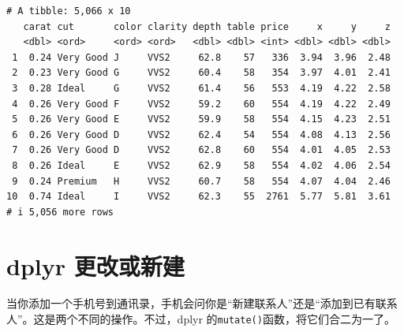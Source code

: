 \documentclass[
  letterpaper,
]{ctexbook}
\begin{document}
\begin{verbatim}
# A tibble: 5,066 x 10
   carat cut       color clarity depth table price     x     y     z
   <dbl> <ord>     <ord> <ord>   <dbl> <dbl> <int> <dbl> <dbl> <dbl>
 1  0.24 Very Good J     VVS2     62.8    57   336  3.94  3.96  2.48
 2  0.23 Very Good G     VVS2     60.4    58   354  3.97  4.01  2.41
 3  0.28 Ideal     G     VVS2     61.4    56   553  4.19  4.22  2.58
 4  0.26 Very Good F     VVS2     59.2    60   554  4.19  4.22  2.49
 5  0.26 Very Good E     VVS2     59.9    58   554  4.15  4.23  2.51
 6  0.26 Very Good D     VVS2     62.4    54   554  4.08  4.13  2.56
 7  0.26 Very Good D     VVS2     62.8    60   554  4.01  4.05  2.53
 8  0.26 Ideal     E     VVS2     62.9    58   554  4.02  4.06  2.54
 9  0.24 Premium   H     VVS2     60.7    58   554  4.07  4.04  2.46
10  0.74 Ideal     I     VVS2     62.3    55  2761  5.77  5.81  3.61
# i 5,056 more rows
\end{verbatim}

\hypertarget{dplyr-ux66f4ux6539ux6216ux65b0ux5efa}{%
\chapter{dplyr 更改或新建}\label{dplyr-ux66f4ux6539ux6216ux65b0ux5efa}}

当你添加一个手机号到通讯录，手机会问你是``新建联系人''还是``添加到已有联系人''。这是两个不同的操作。不过，dplyr
的\texttt{mutate()}函数，将它们合二为一了。
\end{document}

